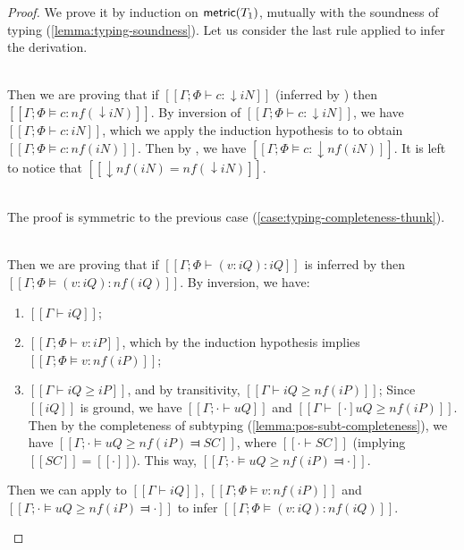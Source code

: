 \begin{proof}
    We prove it by induction on $\mathsf{metric}(T_1)$, mutually with 
    the soundness of typing (\cref{lemma:typing-soundness}).
    Let us consider the last rule applied to infer the derivation.
    \begin{caseof}

        \item {}\\
            \label{case:typing-completeness-thunk}
            Then we are proving that if 
            $[[Γ; Φ ⊢ {c} : ↓iN]]$ (inferred by )
            then $[[Γ; Φ ⊨ {c} : nf(↓iN)]]$.
            By inversion of $[[Γ; Φ ⊢ {c} : ↓iN]]$, we have
            $[[Γ; Φ ⊢ c : iN]]$, which we apply the induction hypothesis to
            to obtain $[[Γ; Φ ⊨ c : nf(iN)]]$.
            Then by , we have $[[Γ; Φ ⊨ {c} : ↓nf(iN)]]$.
            It is left to notice that $[[↓nf(iN) = nf(↓iN)]]$.

        \item {}\\
            The proof is symmetric to the previous case 
            (\cref{case:typing-completeness-thunk}).

        \item {}\\
            \label{case:typing-completeness-pannot}
            Then we are proving that if
            $[[Γ; Φ ⊢ (v : iQ) : iQ]]$ is inferred by 
            then $[[Γ; Φ ⊨ (v : iQ) : nf(iQ)]]$.
            By inversion, we have:
            \begin{enumerate}
                \item $[[Γ ⊢ iQ]]$;
                \item $[[Γ; Φ ⊢ v : iP]]$, which
                    by the induction hypothesis implies $[[Γ; Φ ⊨ v : nf(iP)]]$;
                \item $[[Γ ⊢ iQ ≥ iP]]$, and by transitivity, $[[Γ ⊢ iQ ≥ nf(iP)]]$;
                    Since $[[iQ]]$ is ground, 
                    we have $[[Γ ; · ⊢ uQ]]$ and $[[Γ ⊢ [·]uQ ≥ nf(iP)]]$.
                    Then by the completeness of subtyping
                    (\cref{lemma:pos-subt-completeness}), we have 
                    $[[Γ ; · ⊨ uQ ≥ nf(iP) ⫤ SC]]$, where $[[· ⊢ SC]]$ 
                    (implying $[[SC]] = [[·]]$).
                    This way, $[[Γ ; · ⊨ uQ ≥ nf(iP) ⫤ ·]]$.
            \end{enumerate}
            Then we can apply  to
            $[[Γ ⊢ iQ]]$, $[[Γ; Φ ⊨ v : nf(iP)]]$ and $[[Γ ; · ⊨ uQ ≥ nf(iP) ⫤ ·]]$
            to infer $[[Γ; Φ ⊨ (v : iQ) : nf(iQ)]]$.


\end{caseof}
\end{proof}
